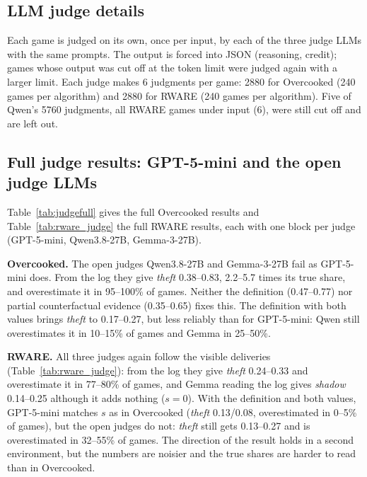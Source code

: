 \documentclass[letterpaper]{article} %
\begin{document}
\subsection{LLM judge details}
\label{app:judge}
Each game is judged on its own, once per input, by each of the three judge LLMs with the same prompts. The output is
forced into JSON (reasoning, credit); games whose output was cut off at the token limit were judged again with a larger
limit. Each judge makes 6 judgments per game: 2880 for Overcooked (240 games per algorithm) and 2880 for RWARE
(240 games per algorithm). Five of Qwen's 5760 judgments, all RWARE games under input (6), were still cut off and are
left out.

\subsection{Full judge results: GPT-5-mini and the open judge LLMs}
\label{app:gpt}
\label{app:open}
Table~\ref{tab:judgefull} gives the full Overcooked results and Table~\ref{tab:rware_judge} the full RWARE results, each
with one block per judge (GPT-5-mini, Qwen3.8-27B, Gemma-3-27B).

\textbf{Overcooked.} The open judges Qwen3.8-27B and Gemma-3-27B fail as GPT-5-mini does. From the log they give \emph{theft} 0.38--0.83, 2.2--5.7 times
its true share, and overestimate it in 95--100\% of games. Neither the definition (0.47--0.77) nor partial
counterfactual evidence (0.35--0.65) fixes this. The definition with both values brings \emph{theft} to 0.17--0.27, but
less reliably than for GPT-5-mini: Qwen still overestimates it in 10--15\% of games and Gemma in 25--50\%.

\textbf{RWARE.} All three judges again follow
the visible deliveries (Table~\ref{tab:rware_judge}): from the log they give \emph{theft} 0.24--0.33 and overestimate it in
77--80\% of games, and Gemma reading the log gives \emph{shadow} 0.14--0.25 although it adds nothing ($s=0$). With the definition and both values, GPT-5-mini
matches $s$ as in Overcooked (\emph{theft} 0.13/0.08, overestimated in 0--5\% of games), but the open judges do not:
\emph{theft} still gets 0.13--0.27 and is overestimated in 32--55\% of games. The direction of the result holds in a second environment, but
the numbers are noisier and the true shares are harder to read than in Overcooked.
\end{document}
